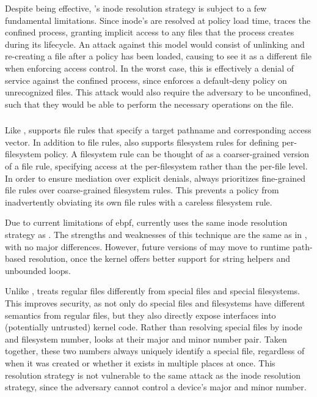 Despite being effective, \bpfbox{}'s inode resolution strategy is subject to a few
fundamental limitations. Since inode's are resolved at policy load time, \bpfbox{} traces
the confined process, granting implicit access to any files that the process creates
during its lifecycle.  An attack against this model would consist of unlinking and
re-creating a file after a policy has been loaded, causing \bpfbox{} to see it as
a different file when enforcing access control. In the worst case, this is effectively
a denial of service against the confined process, since \bpfbox{} enforces a default-deny
policy on unrecognized files.  This attack would also require the adversary to be
unconfined, such that they would be able to perform the necessary operations on the file.

\subsubsection{\bpfcontain{}}

Like \bpfbox{}, \bpfcontain{} supports file rules that specify a target pathname and
corresponding access vector. In addition to file rules, \bpfcontain{} also supports
filesystem rules for defining per-filesystem policy. A filesystem rule can be thought of
as a coarser-grained version of a file rule, specifying access at the per-filesystem
rather than the per-file level. In order to ensure mediation over explicit denials,
\bpfcontain{} always prioritizes fine-grained file rules over coarse-grained filesystem
rules. This prevents a policy from inadvertently obviating its own file rules with
a careless filesystem rule.

Due to current limitations of \gls{ebpf}, \bpfcontain{} currently uses the same inode
resolution strategy as \bpfbox{}. The strengths and weaknesses of this technique are the
same as in \bpfbox{}, with no major differences. However, future versions of \bpfcontain{}
may move to runtime path-based resolution, once the kernel offers better support for
string helpers and unbounded loops.

Unlike \bpfbox{}, \bpfcontain{} treats regular files differently from special files and
special filesystems. This improves security, as not only do special files and filesystems
have different semantics from regular files, but they also directly expose interfaces into
(potentially untrusted) kernel code. Rather than resolving special files by inode and
filesystem number, \bpfcontain{} looks at their major and minor number pair. Taken
together, these two numbers always uniquely identify a special file, regardless of when it
was created or whether it exists in multiple places at once. This resolution strategy is
not vulnerable to the same attack as the inode resolution strategy, since the adversary
cannot control a device's major and minor number.

